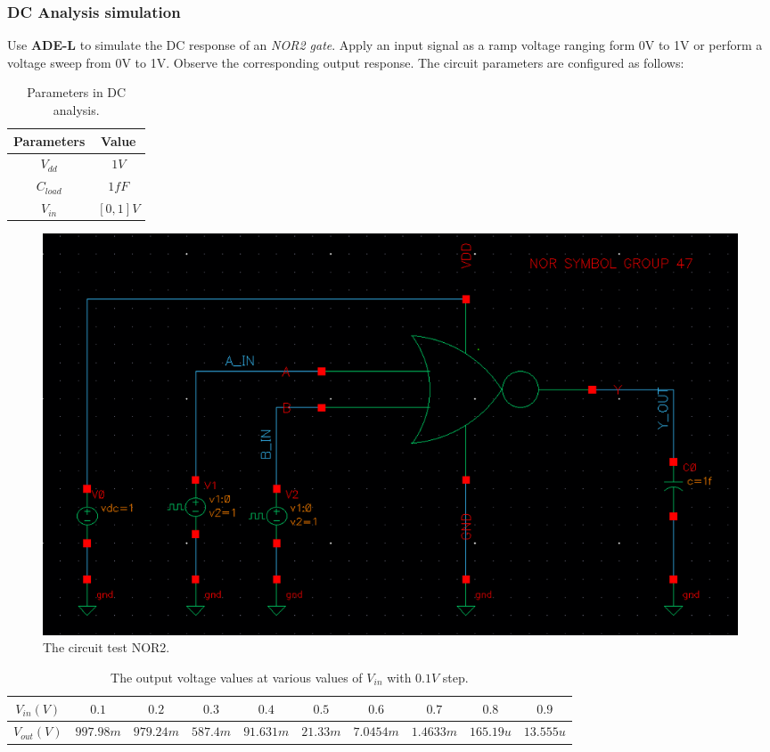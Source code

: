 \subsubsection{DC Analysis simulation}

Use \textbf{ADE-L} to simulate the DC response of an \textit{NOR2 gate}. Apply an input signal as a ramp voltage ranging form 0V to 1V or perform a voltage sweep from 0V to 1V. Observe the corresponding output response. The circuit parameters are configured as follows:

\begin{table}[H]
	\centering
	\begin{tabular}{|c|c|}
		\hline
		Parameters & Value \\
		\hline
		$V_{dd}$ & $1V$ \\
		\hline
		$C_{load}$ & $1fF$\\
		\hline
		$V_{in}$ & $[0, 1] V$\\
		\hline
	\end{tabular}
	\caption{Parameters in DC analysis.}
\end{table}

\begin{figure}[H]
	\centering
	\includegraphics[width=.6\linewidth]{section/EX1/NOR/EX1_NOR2_DCanalysis_schematic.png}
	\caption{The circuit test NOR2.}
\end{figure}

\begin{table}[H]
	\centering
	\begin{tabular}{|c|c|c|c|c|c|c|c|c|c|}
		\hline
		$V_{in}(V)$ & $0.1$ & $0.2$ & $0.3$ & $0.4$ & $0.5$ & $0.6$ & $0.7$ & $0.8$ & $0.9$ \\
		\hline
		$V_{out}(V)$ & $997.98m$ & $979.24m$ & $587.4m$ & $91.631m$ & $21.33m$ & $7.0454m$ & $1.4633m$ & $165.19u$ & $13.555u$ \\
		\hline
	\end{tabular}
	\caption{The output voltage values at various values of $V_{in}$ with $0.1V$ step.}
\end{table}

